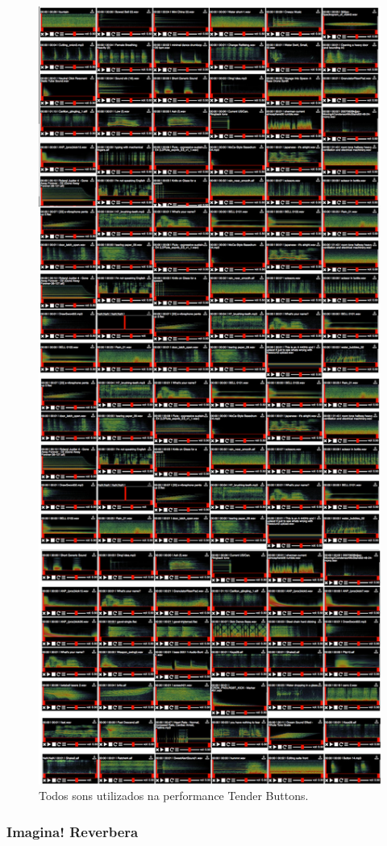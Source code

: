 \begin{figure}

\includegraphics[width=0.8\linewidth]{pictures/cap4/tenderbuttonssounds}
\caption{Todos sons utilizados na performance Tender Buttons.}
\label{allsounds}
\end{figure}




\subsubsection{Imagina! Reverbera}


